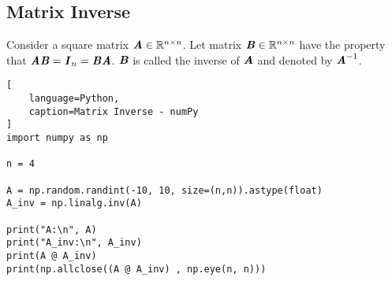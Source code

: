 \subsection{Matrix Inverse \cite{mfml/book/mml/Deisenroth-Faisal-Ong}}

Consider a square matrix $\text{\textbf{\textit{A}}} \in \mathbb{R}^{n\times n}$. 
Let matrix $\text{\textbf{\textit{B}}} \in \mathbb{R}^{n\times n}$ have the property that $\text{\textbf{\textit{A}}}\text{\textbf{\textit{B}}} = \text{\textbf{\textit{I}}}_n = \text{\textbf{\textit{B}}}\text{\textbf{\textit{A}}}$. 
$\text{\textbf{\textit{B}}}$ is called the inverse of $\text{\textbf{\textit{A}}}$ and denoted by $\text{\textbf{\textit{A}}}^{-1}$.
\hfill \cite{mfml/book/mml/Deisenroth-Faisal-Ong}





\begin{lstlisting}[
    language=Python,
    caption=Matrix Inverse - numPy
]
import numpy as np

n = 4

A = np.random.randint(-10, 10, size=(n,n)).astype(float)
A_inv = np.linalg.inv(A)

print("A:\n", A)
print("A_inv:\n", A_inv)
print(A @ A_inv)
print(np.allclose((A @ A_inv) , np.eye(n, n)))
\end{lstlisting}






